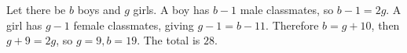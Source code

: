 Let there be $b$ boys and $g$ girls. A boy has $b-1$ male classmates, so $b-1=2g$. A girl has $g-1$ female classmates, giving $g-1=b-11$. Therefore $b=g+10$, then $g+9=2g$, so $g=9,b=19$. The total is $\boxed{28}$.
